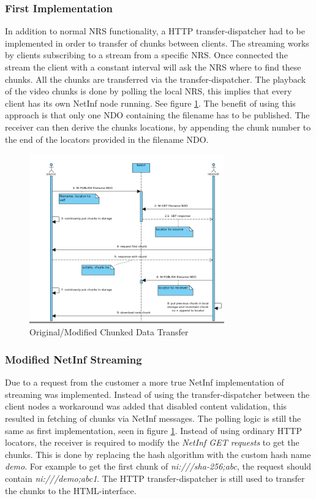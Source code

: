 \subsubsection{First Implementation}
In addition to normal NRS functionality, a HTTP transfer-dispatcher had to be implemented in order to transfer of chunks between clients. The streaming works by clients subscribing to a stream from a specific NRS. Once connected the stream the client with a constant interval will ask the NRS where to find these chunks. All the chunks are transferred via the transfer-dispatcher.
The playback of the video chunks is done by polling the local NRS, this implies that every client has its own NetInf node running. See figure \ref{fig:stream-seqorgmod}. The benefit of using this approach is that only one NDO containing the filename has to be published. The receiver can then derive the chunks locations, by appending the chunk number to the end of the locators provided in the filename NDO.

\begin{figure}[h!]
	\centering
		\includegraphics[width=0.75\textwidth]{./img/sequence_diagram_streaming_orgmod.png}
    	\caption{Original/Modified Chunked Data Transfer}
	\label{fig:stream-seqorgmod}
\end{figure}

\subsubsection{Modified NetInf Streaming}
Due to a request from the customer a more true NetInf implementation of streaming was implemented. Instead of using the transfer-dispatcher between the client nodes a workaround was added that disabled content validation, this resulted in fetching of chunks via NetInf messages. The polling logic is still the same as first implementation, seen in figure \ref{fig:stream-seqorgmod}. Instead of using ordinary HTTP locators, the receiver is required to modify the \textit{NetInf GET requests} to get the chunks. This is done by replacing the hash algorithm with the custom hash name \textit{demo}. For example to get the first chunk of \textit{ni:///sha-256;abc}, the request should contain \textit{ni:///demo;abc1}. The HTTP transfer-dispatcher is still used to transfer the chunks to the HTML-interface.

